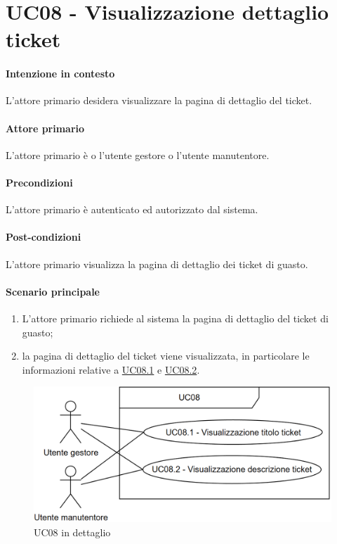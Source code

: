 \section{UC08 - Visualizzazione dettaglio ticket}\label{uc:08}
\paragraph{Intenzione in contesto} L'attore primario desidera visualizzare la pagina di dettaglio del ticket.

\paragraph{Attore primario} L'attore primario è o l'utente gestore o l'utente manutentore.
\paragraph{Precondizioni} L'attore primario è autenticato ed autorizzato dal sistema.
\paragraph{Post-condizioni} L'attore primario visualizza la pagina di dettaglio dei ticket di guasto.
\paragraph{Scenario principale}
\begin{enumerate}
    \item L'attore primario richiede al sistema la pagina di dettaglio del ticket di guasto;
    \item la pagina di dettaglio del ticket viene visualizzata, in particolare le informazioni relative a \hyperref[uc:08.1]{UC08.1} e \hyperref[uc:08.2]{UC08.2}.
\end{enumerate}

\begin{figure}[h]
    \includegraphics[width=\textwidth]{contenuti/img/casi_uso_grafici-uc08.png}
    \caption{UC08 in dettaglio}
    \label{fig:uc08}
\end{figure}


